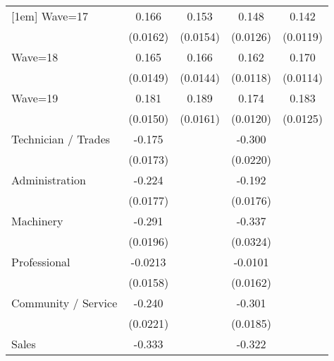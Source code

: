 {\begin{tabular}{l*{4}{c}}
[1em]
Wave=17             &       0.166\sym{***}&       0.153\sym{***}&       0.148\sym{***}&       0.142\sym{***}\\
                    &    (0.0162)         &    (0.0154)         &    (0.0126)         &    (0.0119)         \\
[1em]
Wave=18             &       0.165\sym{***}&       0.166\sym{***}&       0.162\sym{***}&       0.170\sym{***}\\
                    &    (0.0149)         &    (0.0144)         &    (0.0118)         &    (0.0114)         \\
[1em]
Wave=19             &       0.181\sym{***}&       0.189\sym{***}&       0.174\sym{***}&       0.183\sym{***}\\
                    &    (0.0150)         &    (0.0161)         &    (0.0120)         &    (0.0125)         \\
[1em]
Technician / Trades &      -0.175\sym{***}&                     &      -0.300\sym{***}&                     \\
                    &    (0.0173)         &                     &    (0.0220)         &                     \\
[1em]
Administration      &      -0.224\sym{***}&                     &      -0.192\sym{***}&                     \\
                    &    (0.0177)         &                     &    (0.0176)         &                     \\
[1em]
Machinery           &      -0.291\sym{***}&                     &      -0.337\sym{***}&                     \\
                    &    (0.0196)         &                     &    (0.0324)         &                     \\
[1em]
Professional        &     -0.0213         &                     &     -0.0101         &                     \\
                    &    (0.0158)         &                     &    (0.0162)         &                     \\
[1em]
Community / Service &      -0.240\sym{***}&                     &      -0.301\sym{***}&                     \\
                    &    (0.0221)         &                     &    (0.0185)         &                     \\
[1em]
Sales               &      -0.333\sym{***}&                     &      -0.322\sym{***}&                     \\

\end{tabular}}
